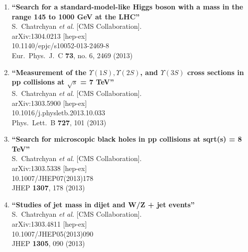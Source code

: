 \documentclass{article}
\begin{document}
\begin{enumerate}
\item%
{\bf ``Search for a standard-model-like Higgs boson with a mass in the range 145 to 1000 GeV at the LHC''}
  \\{}S.~Chatrchyan {\it et al.}  [CMS Collaboration].
  \\{}arXiv:1304.0213 [hep-ex]
    \\{}10.1140/epjc/s10052-013-2469-8
\\{}Eur.\ Phys.\ J.\ C {\bf 73}, no. 6, 2469 (2013) %


\item%
{\bf ``Measurement of the $\Upsilon(1S), \Upsilon(2S)$, and $\Upsilon(3S)$ cross sections in pp collisions at $\sqrt{s}$ = 7 TeV''}
  \\{}S.~Chatrchyan {\it et al.}  [CMS Collaboration].
  \\{}arXiv:1303.5900 [hep-ex]
    \\{}10.1016/j.physletb.2013.10.033
\\{}Phys.\ Lett.\ B {\bf 727}, 101 (2013) %


\item%
{\bf ``Search for microscopic black holes in pp collisions at sqrt(s) = 8 TeV''}
  \\{}S.~Chatrchyan {\it et al.}  [CMS Collaboration].
  \\{}arXiv:1303.5338 [hep-ex]
    \\{}10.1007/JHEP07(2013)178
\\{}JHEP {\bf 1307}, 178 (2013) %


\item%
{\bf ``Studies of jet mass in dijet and W/Z + jet events''}
  \\{}S.~Chatrchyan {\it et al.}  [CMS Collaboration].
  \\{}arXiv:1303.4811 [hep-ex]
    \\{}10.1007/JHEP05(2013)090
\\{}JHEP {\bf 1305}, 090 (2013) %



\end{enumerate}
\end{document}
